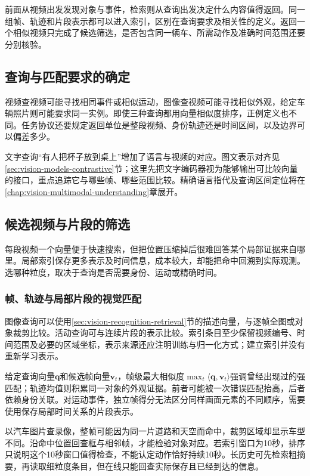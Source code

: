 前面从视频出发发现对象与事件，检索则从查询出发决定什么内容值得返回。同一组帧、轨迹和片段表示都可以进入索引，区别在查询要求及相关性的定义。返回一个相似视频只完成了候选筛选，是否包含同一辆车、所需动作及准确时间范围还要分别核验。

\subsection{查询与匹配要求的确定}
\label{sec:vision-video-query}

视频查视频可能寻找相同事件或相似运动，图像查视频可能寻找相似外观，给定车辆照片则可能要求同一实例。即使三种查询都用向量相似度排序，正例定义也不同。任务协议还要规定返回单位是整段视频、身份轨迹还是时间区间，以及边界可以偏差多少。

文字查询“有人把杯子放到桌上”增加了语言与视频的对应。图文表示对齐见\ref{sec:vision-models-contrastive}节；这里先把文字编码器视为能够输出可比较向量的接口，重点追踪它与哪些帧、哪些范围比较。精确语言指代及查询区间定位将在\ref{chap:vision-multimodal-understanding}章展开。

\subsection{候选视频与片段的筛选}
\label{sec:vision-video-candidates}

每段视频一个向量便于快速搜索，但把位置压缩掉后很难回答某个局部证据来自哪里。局部索引保存更多表示及时间信息，成本较大，却能把命中回溯到实际观测。选哪种粒度，取决于查询是否需要身份、运动或精确时间。

\subsubsection{帧、轨迹与局部片段的视觉匹配}
\label{sec:vision-video-visual-matching}

图像查询可以使用\ref{sec:vision-recognition-retrieval}节的描述向量，与逐帧全图或对象裁剪比较。活动查询可与连续片段的表示比较。索引条目至少保留视频编号、时间范围及必要的区域坐标，表示来源还应注明训练与归一化方式；建立索引并没有重新学习表示。

给定查询向量$\bm{q}$和候选帧向量$\bm{v}_t$，帧级最大相似度$\max_t\langle\bm{q},\bm{v}_t\rangle$强调曾经出现过的强匹配；轨迹均值则积累同一对象的外观证据。前者可能被一次错误匹配抬高，后者依赖身份关联。对运动事件，独立帧得分无法区分同样画面元素的不同顺序，需要使用保存局部时间关系的片段表示。

以汽车图片查录像，整帧可能因为同一片道路和天空而命中，裁剪区域却显示车型不同。沿命中位置回查框与相邻帧，才能检验对象对应。若索引窗口为10秒，排序只说明这个10秒窗口值得检查，不能认定动作恰好持续10秒。长历史可先检索粗摘要，再读取细粒度条目，但在线只能回查实际保存且已经到达的信息。

